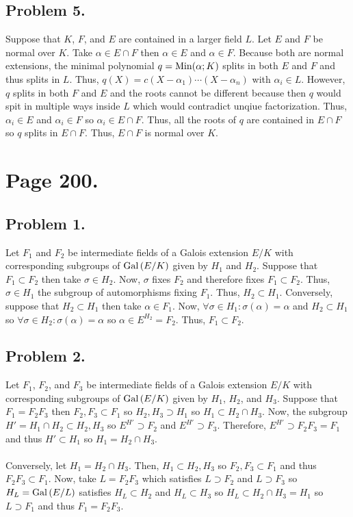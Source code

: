 \documentclass[12pt]{extarticle}
\begin{document}
\subsection*{Problem 5.}
Suppose that $K$, $F$, and $E$ are contained in a larger field $L$. Let $E$ and $F$ be normal over $K$. Take $\alpha \in E \cap F$ then $\alpha \in E$ and $\alpha \in F$. Because both are normal extensions, the minimal polynomial $q =\mathrm{Min}(\alpha;K)$ splits in both $E$ and $F$ and thus splits in $L$. Thus, $q(X) = c(X - \alpha_1) \cdots (X - \alpha_n)$ with $\alpha_i \in L$. However, $q$ splits in both $F$ and $E$ and the roots cannot be different because then $q$ would spit in multiple ways inside $L$ which would contradict unqiue factorization. Thus, $\alpha_i \in E$ and $\alpha_i \in F$ so $\alpha_i \in E \cap F$. Thus, all the roots of $q$ are contained in $E \cap F$ so $q$ splits in $E \cap F$. Thus, $E \cap F$ is normal over $K$. 

\section*{Page 200.} 
\subsection*{Problem 1.} 
Let $F_1$ and $F_2$ be intermediate fields of a Galois extension $E/K$ with corresponding subgroups of $\mathrm{Gal}\left( E/K \right)$ given by $H_1$ and $H_2$. Suppose that $F_1 \subset F_2$ then take $\sigma \in H_2$. Now, $\sigma$ fixes $F_2$ and therefore fixes $F_1 \subset F_2$. Thus, $\sigma \in H_1$ the subgroup of automorphisms fixing $F_1$. Thus, $H_2 \subset H_1$. Conversely, suppose that $H_2 \subset H_1$ then take $\alpha \in F_1$. Now, $\forall \sigma \in H_1 : \sigma(\alpha) = \alpha$ and $H_2 \subset H_1$ so $\forall \sigma \in H_2 : \sigma(\alpha) = \alpha$ so $\alpha \in E^{H_2} = F_2$. Thus, $F_1 \subset F_2$.   
\subsection*{Problem 2.}
Let $F_1$, $F_2$, and $F_3$ be intermediate fields of a Galois extension $E/K$ with corresponding subgroups of $\mathrm{Gal}\left( E/K \right)$ given by $H_1$, $H_2$, and $H_3$. Suppose that $F_1 = F_2 F_3$ then $F_2, F_3 \subset F_1$ so $H_2, H_3 \supset H_1$ so $H_1 \subset H_2 \cap H_3$. Now, the subgroup $H' = H_1 \cap H_2 \subset H_2, H_3$ so $E^{H'} \supset F_2$ and $E^{H'} \supset F_3$. Therefore, $E^{H'} \supset F_2 F_3 = F_1$ and thus $H' \subset H_1$ so $H_1 = H_2 \cap H_3$. \\\\
Conversely, let $H_1 = H_2 \cap H_3$. Then, $H_1 \subset H_2, H_3$ so $F_2, F_3 \subset F_1$ and thus $F_2 F_3 \subset F_1$. Now, take $L = F_2 F_3$ which satisfies $L \supset F_2$ and $L \supset F_3$ so $H_L = \mathrm{Gal}\left( E/L \right)$ satisfies $H_L \subset H_2$ and $H_L \subset H_3$ so $H_L \subset H_2 \cap H_3 = H_1$ so $L \supset F_1$ and thus $F_1 = F_2 F_3$. 
\end{document}
